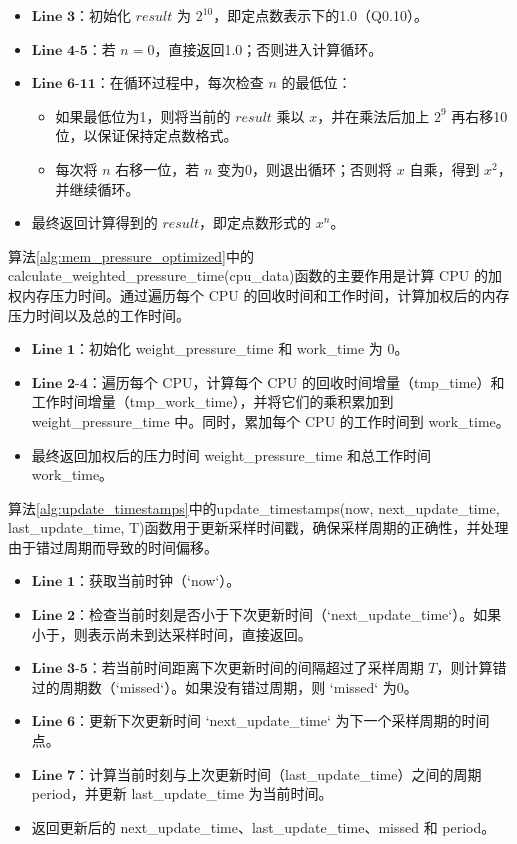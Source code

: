 \begin{itemize}
    \item \(\textbf{Line 3}\)：初始化 \(\textit{result}\) 为 \(2^{10}\)，即定点数表示下的1.0（Q0.10）。
    \item \(\textbf{Line 4-5}\)：若 \(n = 0\)，直接返回1.0；否则进入计算循环。
    \item \(\textbf{Line 6-11}\)：在循环过程中，每次检查 \(n\) 的最低位：
        \begin{itemize}
            \item 如果最低位为1，则将当前的 \(\textit{result}\) 乘以 \(x\)，并在乘法后加上 \(2^9\) 再右移10位，以保证保持定点数格式。
            \item 每次将 \(n\) 右移一位，若 \(n\) 变为0，则退出循环；否则将 \(x\) 自乘，得到 \(x^2\)，并继续循环。
        \end{itemize}
    \item 最终返回计算得到的 \(\textit{result}\)，即定点数形式的 \(x^n\)。
\end{itemize}

算法\ref{alg:mem_pressure_optimized}中的calculate\_weighted\_pressure\_time(cpu\_data)函数的主要作用是计算 CPU 的加权内存压力时间。通过遍历每个 CPU 的回收时间和工作时间，计算加权后的内存压力时间以及总的工作时间。

\begin{itemize}
    \item \(\textbf{Line 1}\)：初始化 weight\_pressure\_time 和 work\_time 为 0。
    \item \(\textbf{Line 2-4}\)：遍历每个 CPU，计算每个 CPU 的回收时间增量（tmp\_time）和工作时间增量（tmp\_work\_time），并将它们的乘积累加到 weight\_pressure\_time 中。同时，累加每个 CPU 的工作时间到 work\_time。
    \item 最终返回加权后的压力时间 weight\_pressure\_time 和总工作时间 work\_time。
\end{itemize}

算法\ref{alg:update_timestamps}中的update\_timestamps(now, next\_update\_time, last\_update\_time, T)函数用于更新采样时间戳，确保采样周期的正确性，并处理由于错过周期而导致的时间偏移。

\begin{itemize}
    \item \(\textbf{Line 1}\)：获取当前时钟（`now`）。
    \item \(\textbf{Line 2}\)：检查当前时刻是否小于下次更新时间（`next\_update\_time`）。如果小于，则表示尚未到达采样时间，直接返回。
    \item \(\textbf{Line 3-5}\)：若当前时间距离下次更新时间的间隔超过了采样周期 \(T\)，则计算错过的周期数（`missed`）。如果没有错过周期，则 `missed` 为0。
    \item \(\textbf{Line 6}\)：更新下次更新时间 `next\_update\_time` 为下一个采样周期的时间点。
    \item \(\textbf{Line 7}\)：计算当前时刻与上次更新时间（last\_update\_time）之间的周期 period，并更新 last\_update\_time 为当前时间。
    \item 返回更新后的 next\_update\_time、last\_update\_time、missed 和 period。
\end{itemize}

